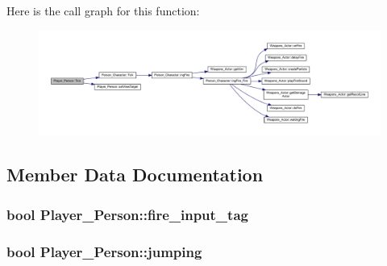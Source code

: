 Here is the call graph for this function\+:\nopagebreak
\begin{figure}[H]
\begin{center}
\leavevmode
\includegraphics[width=350pt]{class_player___person_a7219dd86f30bced16e6b570315d9e74f_cgraph}
\end{center}
\end{figure}




\subsection{Member Data Documentation}
\subsubsection[{\texorpdfstring{fire\+\_\+input\+\_\+tag}{fire_input_tag}}]{\setlength{\rightskip}{0pt plus 5cm}bool Player\+\_\+\+Person\+::fire\+\_\+input\+\_\+tag}\hypertarget{class_player___person_abd97b17132011c46ee81603f813a43d5}{}\label{class_player___person_abd97b17132011c46ee81603f813a43d5}
\subsubsection[{\texorpdfstring{jumping}{jumping}}]{\setlength{\rightskip}{0pt plus 5cm}bool Player\+\_\+\+Person\+::jumping}\hypertarget{class_player___person_a1ad501a127f6f2803929aa40df0ad93f}{}\label{class_player___person_a1ad501a127f6f2803929aa40df0ad93f}
